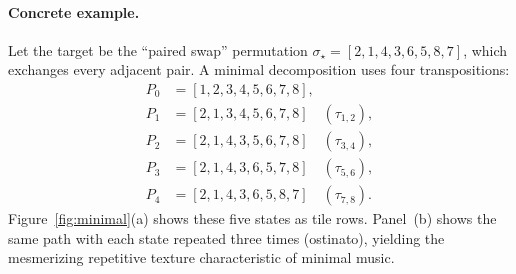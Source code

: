 \documentclass[
  twocolumn,
  aps,
  pra,
  showkeys,
  amsmath,amssymb,
  longbibliography
]{revtex4-2}
\begin{document}
\paragraph*{Concrete example.}
Let the target be the ``paired swap'' permutation
$\sigma_{\star}=[2,1,4,3,6,5,8,7]$, which exchanges every
adjacent pair.
A minimal decomposition uses four transpositions:
\begin{align}
P_0 &= [1,2,3,4,5,6,7,8], \nonumber\\
P_1 &= [2,1,3,4,5,6,7,8] \quad(\tau_{1,2}), \nonumber\\
P_2 &= [2,1,4,3,5,6,7,8] \quad(\tau_{3,4}), \nonumber\\
P_3 &= [2,1,4,3,6,5,7,8] \quad(\tau_{5,6}), \nonumber\\
P_4 &= [2,1,4,3,6,5,8,7] \quad(\tau_{7,8}).
\label{eq:minex}
\end{align}
Figure~\ref{fig:minimal}(a) shows these five states as tile
rows.
Panel~(b) shows the same path with each state repeated
three times (ostinato), yielding the mesmerizing repetitive
texture characteristic of minimal music.
\end{document}
